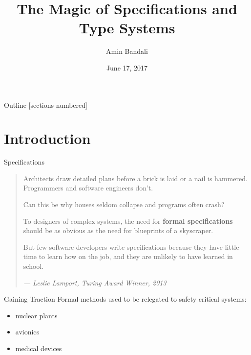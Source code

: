 \documentclass[11pt]{beamer}
\title{The Magic of Specifications and Type Systems}
\date{\footnotesize June 17, 2017}
\author{\large Amin Bandali}
\institute{
  Software Engineering Lab, EECS\\
  York University
}
\begin{document}
\maketitle

\begin{frame}{Outline}
  [sections numbered]
  \tableofcontents[hideallsubsections]
\end{frame}


\section{Introduction}

\begin{frame}[fragile]{Specifications}
  \begin{quote}
    \vspace{.4cm}
    \small
    {\normalfont Architects draw detailed plans before a brick
      is laid or a nail is hammered. Programmers and software
      engineers don't.}\vspace{.3cm}
    \pause

    Can this be why houses seldom collapse and programs often
    crash?\newline
    \pause

    To designers of complex systems, the need for \textbf{formal
      specifications} should be as obvious as the need for blueprints
    of a skyscraper.\newline
    \pause

    But few software developers write specifications because they
    have little time to learn how on the job, and they are unlikely to
    have learned in school.\newline
    \pause

    \hfill \textit{--- Leslie Lamport, Turing Award Winner, 2013}
  \end{quote}

\end{frame}

\begin{frame}[fragile]{Gaining Traction}
  Formal methods used to be relegated to safety critical systems:
  \begin{itemize}
    \item nuclear plants
    \item avionics
    \item medical devices
  \end{itemize}
\end{frame}
\end{document}
